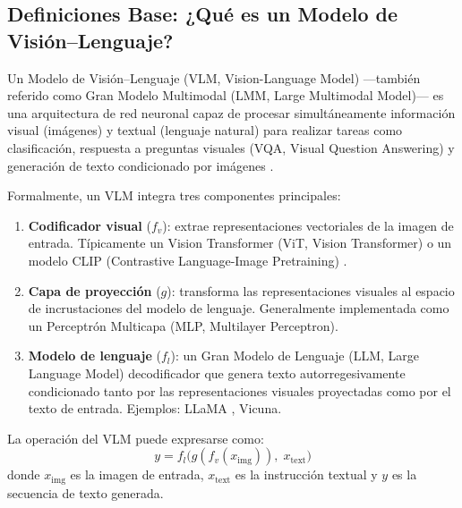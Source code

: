 \documentclass[11pt, a4paper]{article}
\begin{document}
\subsection{Definiciones Base: ¿Qué es un Modelo de Visión--Lenguaje?}

Un Modelo de Visión--Lenguaje (VLM, Vision-Language Model) —también referido como Gran Modelo Multimodal (LMM, Large Multimodal Model)— es una arquitectura de red neuronal capaz de procesar simultáneamente información visual (imágenes) y textual (lenguaje natural) para realizar tareas como clasificación, respuesta a preguntas visuales (VQA, Visual Question Answering) y generación de texto condicionado por imágenes \cite{hartsock_vision-language_2024}.

Formalmente, un VLM integra tres componentes principales:
\begin{enumerate}
    \item \textbf{Codificador visual} ($f_v$): extrae representaciones vectoriales de la imagen de entrada. Típicamente un Vision Transformer (ViT, Vision Transformer) \cite{dosovitskiy_image_2021} o un modelo CLIP (Contrastive Language-Image Pretraining) \cite{radford_learning_nodate}.
    \item \textbf{Capa de proyección} ($g$): transforma las representaciones visuales al espacio de incrustaciones del modelo de lenguaje. Generalmente implementada como un Perceptrón Multicapa (MLP, Multilayer Perceptron).
    \item \textbf{Modelo de lenguaje} ($f_l$): un Gran Modelo de Lenguaje (LLM, Large Language Model) decodificador que genera texto autorregesivamente condicionado tanto por las representaciones visuales proyectadas como por el texto de entrada. Ejemplos: LLaMA \cite{touvron_llama_2023}, Vicuna.
\end{enumerate}

La operación del VLM puede expresarse como:
\begin{equation}
    y = f_l\big(g(f_v(x_{\text{img}})),\; x_{\text{text}}\big)
\end{equation}
donde $x_{\text{img}}$ es la imagen de entrada, $x_{\text{text}}$ es la instrucción textual y $y$ es la secuencia de texto generada.

\end{document}
